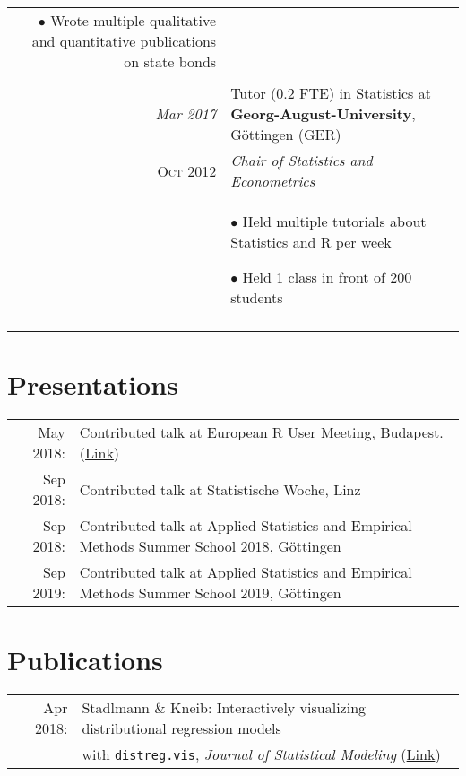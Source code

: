 \documentclass[a4paper,10pt]{article} %
\begin{document}
\begin{longtable}{r|p{10cm}}
{$\bullet$ Wrote multiple qualitative and quantitative publications on state bonds}\\
\multicolumn{2}{c}{} \\


\emph{Mar 2017} & Tutor (0.2 FTE) in Statistics at \textbf{Georg-August-University}, Göttingen (GER)\\
\textsc{Oct 2012} & \emph{Chair of Statistics and Econometrics}\\
& \footnotesize{$\bullet$ Held multiple tutorials about Statistics and R per week

$\bullet$ Held 1 class in front of 200 students}\\
\multicolumn{2}{c}{} \\


\end{longtable}


\section{Presentations}
\begin{tabular}{rl}
May 2018: & Contributed talk at European R User Meeting, Budapest. (\href{https://www.youtube.com/watch?v=ZeBvYWCxkOE}{Link})\\
Sep 2018: & Contributed talk at Statistische Woche, Linz \\
Sep 2018: & Contributed talk at Applied Statistics and Empirical Methods Summer School 2018, Göttingen \\
Sep 2019: & Contributed talk at Applied Statistics and Empirical Methods Summer School 2019, Göttingen \\

\end{tabular}

\section{Publications}
\begin{tabular}{rl}
	Apr 2018: & Stadlmann \& Kneib: Interactively visualizing distributional regression models \\ & with \texttt{distreg.vis},  \emph{Journal of Statistical Modeling} (\href{https://journals.sagepub.com/doi/full/10.1177/1471082X211007308}{Link})\\
	
\end{tabular}
\end{document}
